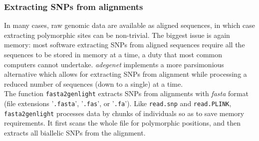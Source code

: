 \documentclass{article}
\begin{document}
\subsubsection{Extracting SNPs from alignments}
In many cases, raw genomic data are available as aligned sequences, in which case extracting
polymorphic sites can be non-trivial.
The biggest issue is again memory: most software extracting SNPs from aligned sequences
require all the sequences to be stored in memory at a time, a duty that most common computers cannot undertake.
\textit{adegenet} implements a more parsimonious alternative which allows for extracting SNPs from
alignment while processing a reduced number of sequences (down to a single) at a time.
\\

The function \texttt{fasta2genlight} extracts SNPs from alignments with \textit{fasta} format (file
extensions '\texttt{.fasta}', '\texttt{.fas}', or '\texttt{.fa}').
Like \texttt{read.snp} and \texttt{read.PLINK}, \texttt{fasta2genlight} processes data by chunks of
individuals so as to save memory requirements.
It first scans the whole file for polymorphic positions, and then extracts all biallelic SNPs from
the alignment.
\\
\end{document}
